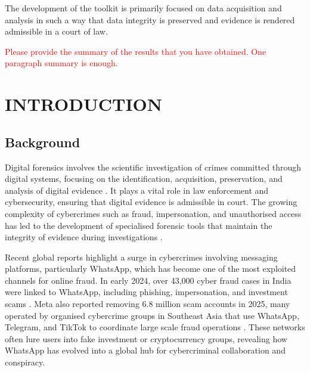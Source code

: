 \documentclass[12pt,a4paper]{report}
\begin{document}
The development of the toolkit is primarily focused on data acquisition and analysis in such a way that data integrity is preserved and evidence is rendered admissible in a court of law.

\textcolor{red}{Please provide the summary of the results that you have obtained. One paragraph summary is enough.}

\newpage
\tableofcontents

\newpage
\chapter{INTRODUCTION}

\section{Background}

Digital forensics involves the scientific investigation of crimes committed through digital systems, focusing on the identification, acquisition, preservation, and analysis of digital evidence \citep{casey2014}. It plays a vital role in law enforcement and cybersecurity, ensuring that digital evidence is admissible in court. The growing complexity of cybercrimes such as fraud, impersonation, and unauthorised access has led to the development of specialised forensic tools that maintain the integrity of evidence during investigations \citep{karie2015}.

Recent global reports highlight a surge in cybercrimes involving messaging platforms, particularly WhatsApp, which has become one of the most exploited channels for online fraud. In early 2024, over 43,000 cyber fraud cases in India were linked to WhatsApp, including phishing, impersonation, and investment scams \citep{ministryhomeaffairs2024}. Meta also reported removing 6.8 million scam accounts in 2025, many operated by organised cybercrime groups in Southeast Asia that use WhatsApp, Telegram, and TikTok to coordinate large scale fraud operations \citep{ikeda2025}. These networks often lure users into fake investment or cryptocurrency groups, revealing how WhatsApp has evolved into a global hub for cybercriminal collaboration and conspiracy.
\end{document}
